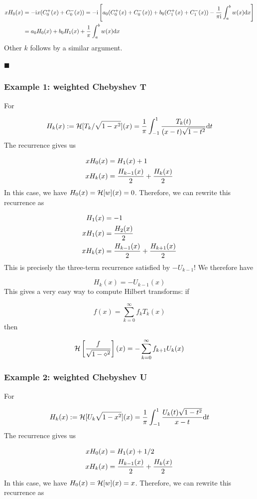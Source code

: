\documentclass[12pt,a4paper]{article}
\def\D{ {\rm d} }
\def\I{ {\rm i} }
\def\HH{ {\cal H} }
\def\dx{\D x}
\def\dt{\D t}
\begin{document}
\begin{align*}
x H_0(x) &= -\I x (C_0^+(x) + C_0^-(x)) = - \I \left[a_0 (C_0^+(x) + C_0^-(x)) + b_0 (C_1^+(x) + C_1^-(x))    -{1 \over  \pi \I} \int_a^b w(x) \dx \right]\\
            &=  a_0 H_0(x) + b_0 H_1(x) + {1 \over \pi} \int_a^b w(x) \dx
\end{align*}
Other $k$ follows by a similar argument.

\ensuremath{\blacksquare}

\subsubsection{Example 1: weighted Chebyshev T}
For

\[
H_k(x) := \HH[T_k/\sqrt{1-x^2}](x) =  {1 \over \pi} \int_{-1}^1 {T_k(t) \over (x-t)\sqrt{1-t^2}} \dt
\]
The recurrence gives us


\begin{align*}
x H_0(x) &= H_1(x) + 1 \\
x H_k(x) &= {H_{k-1}(x) \over 2} + {H_k(x) \over 2} \\
\end{align*}
In this case, we have $H_0(x) = \HH[w](x) =  0$. Therefore, we can rewrite this recurrence as


\begin{align*}
H_1(x)&= -1  \\
x H_1(x) &= {H_2(x) \over 2} \\
x H_k(x) &= {H_{k-1}(x) \over 2} + {H_{k+1}(x) \over 2} \\
\end{align*}
This is precisely the three-term recurrence satisfied by $-U_{k-1}$! We therefore have

\[
H_k(x) = -U_{k-1}(x)
\]
This gives a very easy way to compute Hilbert transforms: if

\[
f(x) = \sum_{k=0}^\infty f_k T_k(x)
\]
then

\[
\HH\left[{f \over \sqrt{1-\diamond^2}}\right](x) = -\sum_{k=0}^\infty f_{k+1} U_k(x)
\]
\subsubsection{Example 2: weighted Chebyshev U}
For

\[
H_k(x) := \HH[U_k \sqrt{1-x^2}](x) =  {1 \over \pi} \int_{-1}^1 {U_k(t) \sqrt{1-t^2} \over x-t} \dt
\]
The recurrence gives us


\begin{align*}
x H_0(x) &= H_1(x) + 1/2 \\
x H_k(x) &= {H_{k-1}(x) \over 2} + {H_k(x) \over 2} \\
\end{align*}
In this case, we have $H_0(x) = \HH[w](x) =  x$. Therefore, we can rewrite this recurrence as
\end{document}
